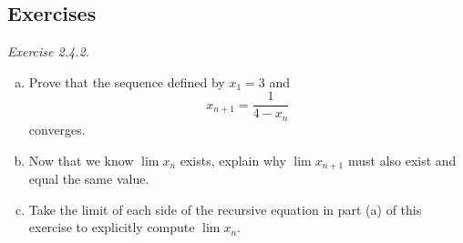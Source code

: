 \documentclass{tufte-book}
\theoremstyle{definition}
\numberwithin{section}{chapter}
\begin{document}
\subsection{Exercises}

	\emph{Exercise 2.4.2.}
		\begin{enumerate}[(a)]
			\item Prove that the sequence defined by $x_1 = 3$ and 
				\[		x_{n+1} = \frac{1}{4-x_n}\]
				converges.
			\item Now that we know $\lim x_n$ exists, explain why $\lim x_{n+1}$ must also exist and equal the same value.
			\item Take the limit of each side of the recursive equation in part (a) of this exercise to explicitly compute  $\lim x_n$.
		\end{enumerate}
		
\end{document}

